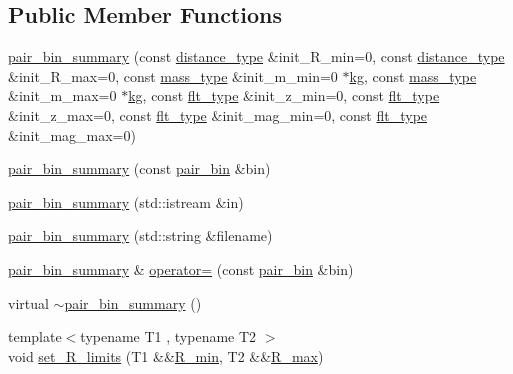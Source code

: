 \subsection*{Public Member Functions}
\begin{DoxyCompactItemize}
\item 
\hyperlink{classIceBRG_1_1pair__bin__summary_a25c4a1af9dd06f9194799604d5d6ea06}{pair\-\_\-bin\-\_\-summary} (const \hyperlink{namespaceIceBRG_a45499647eb87e24c10ab32c628711cec}{distance\-\_\-type} \&init\-\_\-\-R\-\_\-min=0, const \hyperlink{namespaceIceBRG_a45499647eb87e24c10ab32c628711cec}{distance\-\_\-type} \&init\-\_\-\-R\-\_\-max=0, const \hyperlink{namespaceIceBRG_a1be72ac4918a9b029f2eefa084213e35}{mass\-\_\-type} \&init\-\_\-m\-\_\-min=0 $\ast$\hyperlink{namespaceIceBRG_a9233960f6792ea35145d7db55c13e85d}{kg}, const \hyperlink{namespaceIceBRG_a1be72ac4918a9b029f2eefa084213e35}{mass\-\_\-type} \&init\-\_\-m\-\_\-max=0 $\ast$\hyperlink{namespaceIceBRG_a9233960f6792ea35145d7db55c13e85d}{kg}, const \hyperlink{lib_2IceBRG__main_2common_8h_ad0f130a56eeb944d9ef2692ee881ecc4}{flt\-\_\-type} \&init\-\_\-z\-\_\-min=0, const \hyperlink{lib_2IceBRG__main_2common_8h_ad0f130a56eeb944d9ef2692ee881ecc4}{flt\-\_\-type} \&init\-\_\-z\-\_\-max=0, const \hyperlink{lib_2IceBRG__main_2common_8h_ad0f130a56eeb944d9ef2692ee881ecc4}{flt\-\_\-type} \&init\-\_\-mag\-\_\-min=0, const \hyperlink{lib_2IceBRG__main_2common_8h_ad0f130a56eeb944d9ef2692ee881ecc4}{flt\-\_\-type} \&init\-\_\-mag\-\_\-max=0)
\item 
\hyperlink{classIceBRG_1_1pair__bin__summary_a832ae0f4e36a7850560597b91ef5745f}{pair\-\_\-bin\-\_\-summary} (const \hyperlink{classIceBRG_1_1pair__bin}{pair\-\_\-bin} \&bin)
\item 
\hyperlink{classIceBRG_1_1pair__bin__summary_a4d91275cda5af40a8de4607df904f318}{pair\-\_\-bin\-\_\-summary} (std\-::istream \&in)
\item 
\hyperlink{classIceBRG_1_1pair__bin__summary_a0aaf039eef5a7173408bcf95dbaa3426}{pair\-\_\-bin\-\_\-summary} (std\-::string \&filename)
\item 
\hyperlink{classIceBRG_1_1pair__bin__summary}{pair\-\_\-bin\-\_\-summary} \& \hyperlink{classIceBRG_1_1pair__bin__summary_a7465f0e34354fc97d706ba3c0365e0a5}{operator=} (const \hyperlink{classIceBRG_1_1pair__bin}{pair\-\_\-bin} \&bin)
\item 
virtual \hyperlink{classIceBRG_1_1pair__bin__summary_a6a9e88649e3a606a08577205f342cf1a}{$\sim$pair\-\_\-bin\-\_\-summary} ()
\item 
{\footnotesize template$<$typename T1 , typename T2 $>$ }\\void \hyperlink{classIceBRG_1_1pair__bin__summary_a5b5dc0fc4077d5dd7b7dafbdab684661}{set\-\_\-\-R\-\_\-limits} (T1 \&\&\hyperlink{classIceBRG_1_1pair__bin__summary_af1ee4f7eeb70c23843a0ad4af2f41ef9}{R\-\_\-min}, T2 \&\&\hyperlink{classIceBRG_1_1pair__bin__summary_a26bb6d459f592d9ff9f4a11255d5884b}{R\-\_\-max})

\end{DoxyCompactItemize}
